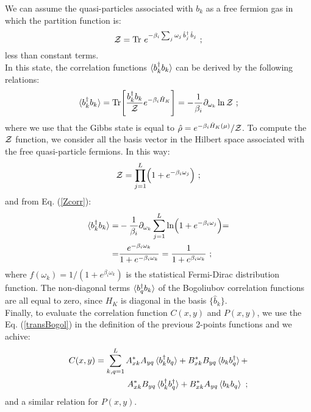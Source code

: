 \documentclass[pra,twocolumn,preprintnumbers,amsmath,amssymb,nofootinbib,floatfix,longbibliography]{revtex4}
\begin{document}
  We can assume the quasi-particles associated with $b_k$
  as a free fermion gas in which the partition function is:
  \begin{equation}
    \label{Partition}
    {\cal Z} = {\rm Tr} \,\, e^{-\beta_i
      \sum_j \omega _j \,\hat b^\dagger _j\, \hat b_j}\,\,;
  \end{equation}
  less than constant terms.\\
  In this state, the
  correlation functions $\braket{b^\dagger_k b_k}$
  can be derived by the following relations:
  \begin{align}
    \label{Zcorr}
    \braket{b^\dagger_k b_k} =
    {\rm Tr} \Biggr[ \frac{b^\dagger_k b_k}
                    {\cal Z}e^{-\beta_i \hat H_K} \Biggr]
    = -\frac{1}{\beta_i}\partial_{\omega_k}\ln{\cal Z}\,\,;
  \end{align}
  where we use that the Gibbs state is equal to
  $\hat \rho = e^{-\beta_i\hat H_K(\mu)}/{\cal Z}$. To
  compute the ${\cal Z}$ function, we consider all the
  basis vector in the Hilbert space associated with the
  free quasi-particle fermions. In this way:
  \begin{equation}
    {\cal Z} = \prod _{j=1}^L
    \Bigl( 1 + e^{-\beta_i \omega_j} \Bigl) \,\,;
  \end{equation}
  and from Eq. (\ref{Zcorr}):
  \begin{align}
    \braket{b^\dagger_k b_k}= &
    -\frac{1}{\beta_i}\partial_{\omega_k} \sum _{j=1}^L
    \ln\Bigl( 1 + e^{-\beta_i \omega_j} \Bigl)= \\
    = &  \frac{e^{-\beta_i \omega_k}}
            { 1 + e^{-\beta_i \omega_k} } =
    \frac{1}{1 + e^{\beta_i \omega_k}}
    \,\,;
  \end{align}
  where $f(\omega_k) = 1 / (1 + e^{\beta_i \omega_k})$ is
  the statistical Fermi-Dirac distribution function. The
  non-diagonal terms $\braket{b^\dagger_q b_k}$ of the
  Bogoliubov correlation functions are all equal to zero,
  since $H_K$ is diagonal in the basis $\{\hat b_k\}$.\\

Finally, to evaluate the correlation function $C(x,y)$ and
$P(x,y)$, we use the Eq. (\ref{transBogol}) in the
definition of the previous 2-points functions and we
achive:
\begin{align}
  \label{initcorr}
   C(x,y) = \sum_{k,q=1}^L
  A^*_{xk}A_{yq} \braket{b^\dagger_k b_q}
  + B^*_{xk} B_{yq} \braket{b_k b^\dagger_q} + \notag\\
  A^*_{xk} B_{yq} \braket{b^\dagger_k b^\dagger_q} +
  B^*_{xk} A_{yq} \braket{b_k b_q}
  \,\,;
\end{align}
and a similar relation for $P(x,y)$.
\end{document}
